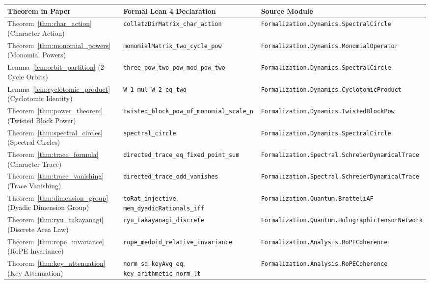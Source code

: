 \documentclass[11pt,reqno]{article}
\theoremstyle{plain}
\theoremstyle{definition}
\theoremstyle{remark}
\begin{document}
\begin{table}[h!]
\centering
\small
\begin{tabular}{lll}
\toprule
\textbf{Theorem in Paper} & \textbf{Formal Lean 4 Declaration} & \textbf{Source Module} \\
\midrule
Theorem~\ref{thm:char_action} (Character Action) & \texttt{collatzDirMatrix\_char\_action} & \texttt{Formalization.Dynamics.SpectralCircle} \\
Theorem~\ref{thm:monomial_powers} (Monomial Powers) & \texttt{monomialMatrix\_two\_cycle\_pow} & \texttt{Formalization.Dynamics.MonomialOperator} \\
Lemma~\ref{lem:orbit_partition} (2-Cycle Orbits) & \texttt{three\_pow\_two\_pow\_mod\_pow\_two} & \texttt{Formalization.Dynamics.SpectralCircle} \\
Lemma~\ref{lem:cyclotomic_product} (Cyclotomic Identity) & \texttt{W\_1\_mul\_W\_2\_eq\_two} & \texttt{Formalization.Dynamics.CyclotomicProduct} \\
Theorem~\ref{thm:power_theorem} (Twisted Block Power) & \texttt{twisted\_block\_pow\_of\_monomial\_scale\_n} & \texttt{Formalization.Dynamics.TwistedBlockPow} \\
Theorem~\ref{thm:spectral_circles} (Spectral Circles) & \texttt{spectral\_circle} & \texttt{Formalization.Dynamics.SpectralCircle} \\
Theorem~\ref{thm:trace_formula} (Character Trace) & \texttt{directed\_trace\_eq\_fixed\_point\_sum} & \texttt{Formalization.Spectral.SchreierDynamicalTrace} \\
Theorem~\ref{thm:trace_vanishing} (Trace Vanishing) & \texttt{directed\_trace\_odd\_vanishes} & \texttt{Formalization.Spectral.SchreierDynamicalTrace} \\
Theorem~\ref{thm:dimension_group} (Dyadic Dimension Group) & \texttt{toRat\_injective}, \texttt{mem\_dyadicRationals\_iff} & \texttt{Formalization.Quantum.BratteliAF} \\
Theorem~\ref{thm:ryu_takayanagi} (Discrete Area Law) & \texttt{ryu\_takayanagi\_discrete} & \texttt{Formalization.Quantum.HolographicTensorNetwork} \\
Theorem~\ref{thm:rope_invariance} (RoPE Invariance) & \texttt{rope\_medoid\_relative\_invariance} & \texttt{Formalization.Analysis.RoPECoherence} \\
Theorem~\ref{thm:key_attenuation} (Key Attenuation) & \texttt{norm\_sq\_keyAvg\_eq}, \texttt{key\_arithmetic\_norm\_lt} & \texttt{Formalization.Analysis.RoPECoherence} \\

\end{tabular}
\end{table}
\end{document}
